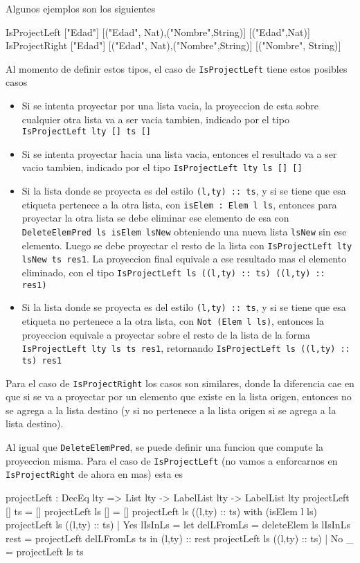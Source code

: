 Algunos ejemplos son los siguientes
\begin{code}
IsProjectLeft ["Edad"] [("Edad", Nat),("Nombre",String)] 
  [("Edad",Nat)]
IsProjectRight ["Edad"] [("Edad", Nat),("Nombre",String)]
  [("Nombre", String)] 
\end{code}

Al momento de definir estos tipos, el caso de \texttt{IsProjectLeft} tiene estos posibles casos
\begin{itemize}
\item Si se intenta proyectar por una lista vacia, la proyeccion de esta sobre cualquier otra lista va a ser vacia tambien, indicado por el tipo \texttt{IsProjectLeft {lty} [] ts []}
\item Si se intenta proyectar hacia una lista vacia, entonces el resultado va a ser vacio tambien, indicado por el tipo \texttt{IsProjectLeft {lty} ls [] []}
\item Si la lista donde se proyecta es del estilo \texttt{(l,ty) :: ts}, y si se tiene que esa etiqueta pertenece a la otra lista, con \texttt{isElem : Elem l ls}, entonces para proyectar la otra lista se debe eliminar ese elemento de esa con \texttt{DeleteElemPred ls isElem lsNew} obteniendo una nueva lista \texttt{lsNew} sin ese elemento. Luego se debe proyectar el resto de la lista con \texttt{IsProjectLeft {lty} lsNew ts res1}. La proyeccion final equivale a ese resultado mas el elemento eliminado, con el tipo \texttt{IsProjectLeft ls ((l,ty) :: ts) ((l,ty) :: res1)}
\item Si la lista donde se proyecta es del estilo \texttt{(l,ty) :: ts}, y si se tiene que esa etiqueta no pertenece a la otra lista, con \texttt{Not (Elem l ls)}, entonces la proyeccion equivale a proyectar sobre el resto de la lista de la forma \texttt{IsProjectLeft {lty} ls ts res1}, retornando \texttt{IsProjectLeft ls ((l,ty) :: ts) res1}
\end{itemize}

Para el caso de \texttt{IsProjectRight} los casos son similares, donde la diferencia cae en que si se va a proyectar por un elemento que existe en la lista origen, entonces no se agrega a la lista destino (y si no pertenece a la lista origen si se agrega a la lista destino).

Al igual que \texttt{DeleteElemPred}, se puede definir una funcion que compute la proyeccion misma. Para el caso de \texttt{IsProjectLeft} (no vamos a enforcarnos en \texttt{IsProjectRight} de ahora en mas) esta es

\begin{code}
projectLeft : DecEq lty => List lty -> LabelList lty -> 
  LabelList lty
projectLeft [] ts = []
projectLeft ls [] = []
projectLeft ls ((l,ty) :: ts) with (isElem l ls)
  projectLeft ls ((l,ty) :: ts) | Yes lIsInLs = 
    let delLFromLs = deleteElem ls lIsInLs
        rest = projectLeft delLFromLs ts
    in (l,ty) :: rest
  projectLeft ls ((l,ty) :: ts) | No _ = projectLeft ls ts
\end{code}


